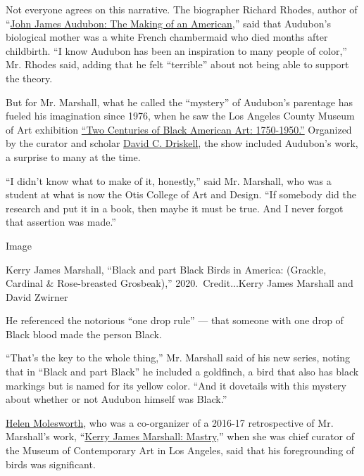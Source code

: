 Not everyone agrees on this narrative. The biographer Richard Rhodes,
author of
``\href{https://www.nytimes.com/2004/10/31/books/review/john-james-audubon-the-birdman-of-america.html}{John
James Audubon: The Making of an American,}'' said that Audubon's
biological mother was a white French chambermaid who died months after
childbirth. ``I know Audubon has been an inspiration to many people of
color,'' Mr. Rhodes said, adding that he felt ``terrible'' about not
being able to support the theory.

But for Mr. Marshall, what he called the ``mystery'' of Audubon's
parentage has fueled his imagination since 1976, when he saw the Los
Angeles County Museum of Art exhibition
\href{https://www.lacma.org/art/exhibition/two-centuries-black-american-art}{``Two
Centuries of Black American Art: 1750-1950.''} Organized by the curator
and scholar
\href{https://driskellcenterarchives.wordpress.com/tag/two-centuries-of-black-american-art-1750-1950/}{David
C. Driskell}, the show included Audubon's work, a surprise to many at
the time.

``I didn't know what to make of it, honestly,'' said Mr. Marshall, who
was a student at what is now the Otis College of Art and Design. ``If
somebody did the research and put it in a book, then maybe it must be
true. And I never forgot that assertion was made.''

Image

Kerry James Marshall, ``Black and part Black Birds in America: (Grackle,
Cardinal \& Rose-breasted Grosbeak),'' 2020.~Credit...Kerry James
Marshall and David Zwirner

He referenced the notorious ``one drop rule'' --- that someone with one
drop of Black blood made the person Black.

``That's the key to the whole thing,'' Mr. Marshall said of his new
series, noting that in ``Black and part Black'' he included a goldfinch,
a bird that also has black markings but is named for its yellow color.
``And it dovetails with this mystery about whether or not Audubon
himself was Black.''

\href{https://www.moca.org/exhibition/kerry-james-marshall-mastry}{Helen
Molesworth}, who was a co-organizer of a 2016-17 retrospective of Mr.
Marshall's work,
``\href{https://www.nytimes.com/2016/10/21/arts/design/kerry-james-marshalls-paintings-show-what-it-means-to-be-black-in-america.html}{Kerry
James Marshall: Mastry},'' when she was chief curator of the Museum of
Contemporary Art in Los Angeles, said that his foregrounding of birds
was significant.

